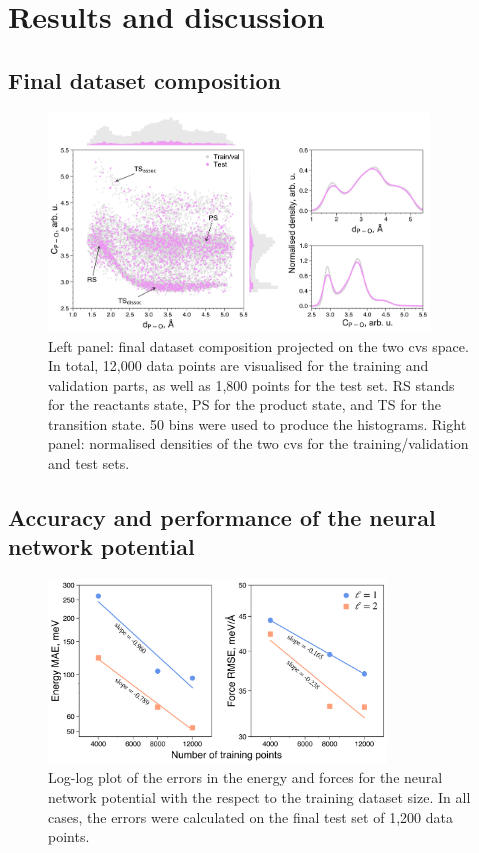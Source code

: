 \chapter{Results and discussion}

\section{Final dataset composition}

\begin{figure}[ht]
    \centering
    \includegraphics[width=0.9\textwidth]{Figures/4_Results/results_final_dataset_with_histograms.png}
    \caption{Left panel: final dataset composition projected on the two \acp{cv} space. In total, 12,000 data points are visualised for the training and validation parts, as well as 1,800 points for the test set. RS stands for the reactants state, PS for the product state, and TS for the transition state. 50 bins were used to produce the histograms. Right panel: normalised densities of the two \acp{cv} for the training/validation and test sets.}
    \label{fig:final_dataset}
\end{figure}


\clearpage
\section{Accuracy and performance of the neural network potential}

\begin{figure}[ht]
    \centering
    \includegraphics[width=0.8\textwidth]{Figures/4_Results/results_nnp_loglog_energy_force.png}
    \caption{Log-log plot of the errors in the energy and forces for the neural network potential with the respect to the training dataset size. In all cases, the errors were calculated on the final test set of 1,200 data points.}
    \label{fig:nnp_log-log}
\end{figure}

